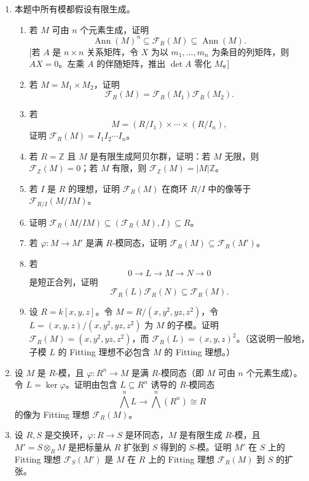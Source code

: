 \begin{enumerate}[label=\arabic*.]
	\item 本题中所有模都假设有限生成。
	\begin{enumerate}[label=(\alph*)]
		\item 若 $M$ 可由 $n$ 个元素生成，证明
		\[
		\operatorname{Ann}(M)^n\subseteq \mathcal F_R(M)\subseteq\operatorname{Ann}(M).
		\]
		[若 $A$ 是 $n\times n$ 关系矩阵，令 $X$ 为以 $m_1,
		\ldots,m_n$ 为条目的列矩阵，则 $AX=0$。左乘 $A$ 的伴随矩阵，推出 $\det A$ 零化 $M$。]
		\item 若 $M=M_1\times M_2$，证明
		\[
		\mathcal F_R(M)=\mathcal F_R(M_1)\mathcal F_R(M_2).
		\]
		\item 若
		\[
		M=(R/I_1)\times\cdots\times(R/I_n),
		\]
		证明 $\mathcal F_R(M)=I_1I_2\cdots I_n$。
		\item 若 $R=\mathbb Z$ 且 $M$ 是有限生成阿贝尔群，证明：若 $M$ 无限，则 $\mathcal F_{\mathbb Z}(M)=0$；若 $M$ 有限，则 $\mathcal F_{\mathbb Z}(M)=|M|\mathbb Z$。
		\item 若 $I$ 是 $R$ 的理想，证明 $\mathcal F_R(M)$ 在商环 $R/I$ 中的像等于 $\mathcal F_{R/I}(M/IM)$。
		\item 证明 $\mathcal F_R(M/IM)\subseteq(\mathcal F_R(M),I)\subseteq R$。
		\item 若 $\varphi:M\to M'$ 是满 $R$-模同态，证明 $\mathcal F_R(M)\subseteq\mathcal F_R(M')$。
		\item 若
		\[
		0\longrightarrow L\longrightarrow M\longrightarrow N\longrightarrow0
		\]
		是短正合列，证明
		\[
		\mathcal F_R(L)\mathcal F_R(N)\subseteq\mathcal F_R(M).
		\]
		\item 设 $R=k[x,y,z]$。令 $M=R/(x,y^2,yz,z^2)$，令 $L=(x,y,z)/(x,y^2,yz,z^2)$ 为 $M$ 的子模。证明 $\mathcal F_R(M)=(x,y^2,yz,z^2)$，而 $\mathcal F_R(L)=(x,y,z)^2$。（这说明一般地，子模 $L$ 的 Fitting 理想不必包含 $M$ 的 Fitting 理想。）
	\end{enumerate}
	
	\item 设 $M$ 是 $R$-模，且 $\varphi:R^n\to M$ 是满 $R$-模同态（即 $M$ 可由 $n$ 个元素生成）。令 $L=\ker\varphi$。证明由包含 $L\subseteq R^n$ 诱导的 $R$-模同态
	\[
	\bigwedge^n L\longrightarrow \bigwedge^n(R^n)\cong R
	\]
	的像为 Fitting 理想 $\mathcal F_R(M)$。
	
	\item 设 $R,S$ 是交换环，$\varphi:R\to S$ 是环同态，$M$ 是有限生成 $R$-模，且 $M'=S\otimes_R M$ 是把标量从 $R$ 扩张到 $S$ 得到的 $S$-模。证明 $M'$ 在 $S$ 上的 Fitting 理想 $\mathcal F_S(M')$ 是 $M$ 在 $R$ 上的 Fitting 理想 $\mathcal F_R(M)$ 到 $S$ 的扩张。
	

\end{enumerate}
